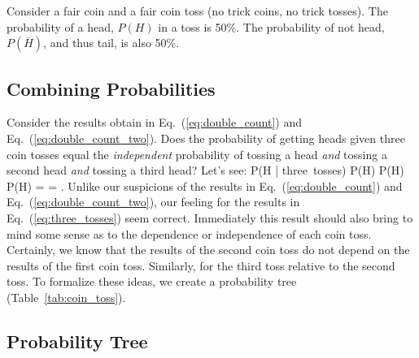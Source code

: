 Consider a fair coin and a fair coin toss 
(no trick coins, no trick tosses).  
The probability of a head, $P(H)$ in a toss is 50\%.  
The probability of not head, $P(\overline{H})$, and thus tail, is also 50\%.  

\subsection{Combining Probabilities}
Consider the results obtain in Eq.~(\ref{eq:double_count}) 
and Eq.~(\ref{eq:double_count_two}).  Does the 
probability of getting heads given three coin 
tosses equal the {\em independent} 
probability of tossing a head {\em and} 
tossing a second head {\em and} tossing a third head?  
Let's see:
\be
P(H |\; \mbox{three tosses}) 
P(H) \;\cap\; P(H) \;\cap\; P(H) 
=  \cdot{} \cdot{} = .
\label{eq:three_tosses}
\ee
Unlike our suspicions of the results in 
Eq.~(\ref{eq:double_count}) and Eq.~(\ref{eq:double_count_two}), 
our feeling for the results
in Eq.~(\ref{eq:three_tosses}) seem correct.  Immediately this result 
should also bring to mind some sense as to the dependence or independence of 
each coin toss.  Certainly, we know
that the results of the second coin toss do not depend on the 
results of the first coin toss.  Similarly, for the third toss relative 
to the second toss.  To formalize these ideas, we create a probability tree 
(Table~\ref{tab:coin_toss}).

\subsection{Probability Tree}


